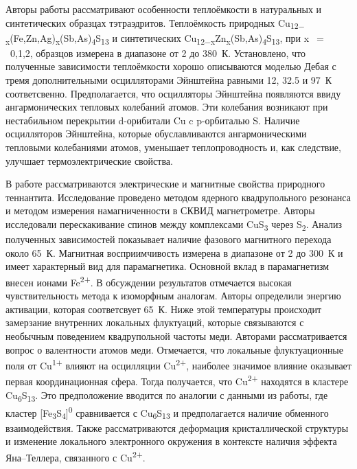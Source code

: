 Авторы работы \cite{Lara-Curzio2014} рассматривают особенности теплоёмкости в натуральных и синтетических образцах тэтраэдритов. Теплоёмкость природных  Cu\textsubscript{12$-$x}(Fe,Zn,Ag)\textsubscript{x}(Sb,As)\textsubscript{4}S\textsubscript{13} и синтетических Cu\textsubscript{12$-$x}Zn\textsubscript{x}(Sb,As)\textsubscript{4}S\textsubscript{13}, при x~$=$~0,1,2, образцов измерена в диапазоне от 2 до 380~К. Установлено, что полученные зависимости теплоёмкости хорошо описываются моделью Дебая с тремя дополнительными осцилляторами Эйнштейна равными 12, 32.5 и 97~К соответсвенно. Предполагается, что осцилляторы Эйнштейна появляются ввиду ангармонических тепловых колебаний атомов. Эти колебания возникают при нестабильном перекрытии d-орибитали Cu c p-орбиталью S.
Наличие осцилляторов Эйнштейна, которые обуславливаются ангармоническими тепловыми колебаниями атомов, уменьшает теплопроводность и, как следствие, улучшает термоэлектрические свойства.

В работе \cite{Gainov2008} рассматриваются электрические и магнитные свойства природного теннантита. Исследование проведено методом ядерного квадрупольного резонанса и методом измерения намагниченности в СКВИД магнетрометре. Авторы исследовали перескакивание спинов между комплексами CuS\textsubscript{3} через S\textsubscript{2}. Анализ полученных зависимостей показывает наличие фазового магнитного перехода около 65~К. Магнитная восприимчивость измерена в диапазоне от 2 до 300~К и имеет характерный вид для парамагнетика. Основной вклад в парамагнетизм внесен ионами Fe\textsuperscript{2+}. В обсуждении результатов отмечается высокая чувствительность метода к изоморфным аналогам. Авторы определили энергию активации, которая соответсвует 65~К. Ниже этой температуры происходит замерзание внутренних локальных флуктуаций, которые связываются с необычным поведением квадрупольной частоты меди. Авторами рассматривается вопрос о валентности атомов меди. Отмечается, что локальные флуктуационные поля от Cu\textsuperscript{1+} влияют на осцилляции Cu\textsuperscript{2+}, наиболее значимое влияние оказывает первая координационная сфера. Тогда получается, что Cu\textsuperscript{2+} находятся в кластере Cu\textsubscript{6}S\textsubscript{13}. Это предположение вводится по аналогии с данными из работы\cite{Pattrick1993}, где кластер [Fe\textsubscript{3}S\textsubscript{4}]\textsuperscript{0} сравнивается с Cu\textsubscript{6}S\textsubscript{13} и предполагается наличие обменного взаимодействия.  Также рассматриваются деформация кристаллической структуры и изменение локального электронного окружения в контексте наличия эффекта Яна--Теллера, связанного с  Cu\textsuperscript{2+}.

